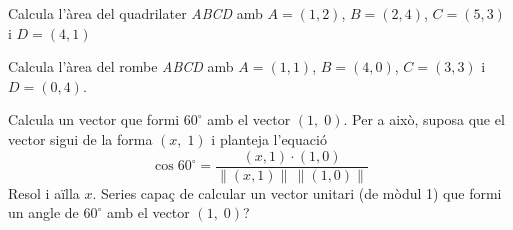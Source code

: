 \begin{activitats}
\begin{mylist}
	  
	 \exer  Calcula l'àrea del quadrilater \textit{ABCD} amb $A = (1, 2)$, $B = (2, 4)$, $C = (5, 3)$ i $D = (4, 1)$
	 
	  
	 \exer  Calcula l'àrea del rombe \textit{ABCD} amb  $A = (1, 1)$, $B = (4, 0)$, $C = (3, 3)$ i $D = (0, 4)$.
	 
	  
	 \exer  Calcula un vector que formi $60^\circ$ amb el vector $\left(1,\; 0\right)$. Per a això, suposa que el vector sigui de la forma $\left(x,\; 1\right)$ i planteja l'equació 
	 \begin{equation*}
	 \cos 60^\circ=\dfrac{\left(x,1\right)\cdot \left(1,0\right)}{\left\| \left(x,1\right)\right\| \, \left\| \left(1,0\right)\right\| } 
	 \end{equation*}
	    Resol i aïlla $x$. Series capaç de calcular un vector unitari (de mòdul 1) que formi un angle de $60^\circ$ amb el vector $\left(1,\; 0\right)$?
	 

\end{mylist}
\end{activitats}
